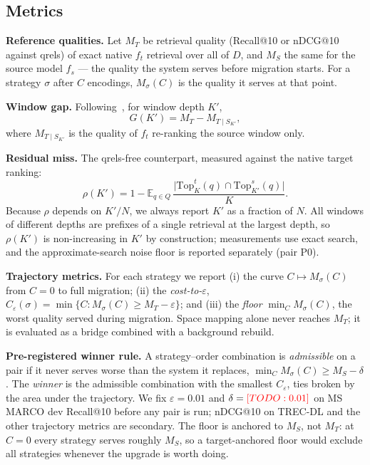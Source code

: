 \documentclass[conference]{IEEEtran}
\newcommand{\todo}[1]{\textcolor{red}{[TODO: #1]}}
\newcommand{\topk}{\mathrm{Top}}
\begin{document}
\subsection{Metrics}

\textbf{Reference qualities.} Let $M_T$ be retrieval quality (Recall@10 or nDCG@10
against qrels) of exact native $f_t$ retrieval over all of $D$, and $M_S$ the same for
the source model $f_s$ --- the quality the system serves before migration starts. For a
strategy $\sigma$ after $C$ encodings, $M_\sigma(C)$ is the quality it serves at that point.

\textbf{Window gap.} Following~\cite{embedflow}, for window depth $K'$,
\[
G(K') = M_T - M_{T\mid S_{K'}},
\]
where $M_{T\mid S_{K'}}$ is the quality of $f_t$ re-ranking the source window only.

\textbf{Residual miss.} The qrels-free counterpart, measured against the native target
ranking:
\[
\rho(K') = 1 - \mathbb{E}_{q\in Q}\,
\frac{\lvert \topk_K^{t}(q) \cap \topk_{K'}^{s}(q)\rvert}{K}.
\]
Because $\rho$ depends on $K'/N$, we always report $K'$ as a fraction of $N$.
All windows of different depths are prefixes of a single retrieval at the largest depth,
so $\rho(K')$ is non-increasing in $K'$ by construction; measurements use exact search,
and the approximate-search noise floor is reported separately (pair P0).

\textbf{Trajectory metrics.} For each strategy we report (i) the curve
$C \mapsto M_\sigma(C)$ from $C{=}0$ to full migration; (ii) the \emph{cost-to-$\varepsilon$},
$C_\varepsilon(\sigma) = \min\{C : M_\sigma(C) \ge M_T - \varepsilon\}$; and (iii) the
\emph{floor} $\min_C M_\sigma(C)$, the worst quality served during migration.
Space mapping alone never reaches $M_T$; it is evaluated as a bridge combined with a
background rebuild.

\textbf{Pre-registered winner rule.} A strategy--order combination is \emph{admissible}
on a pair if it never serves worse than the system it replaces,
$\min_C M_\sigma(C) \ge M_S - \delta$. The \emph{winner} is the admissible combination
with the smallest $C_{\varepsilon}$, ties broken by the area under the trajectory. We fix
$\varepsilon = 0.01$ and $\delta = \todo{0.01}$ on MS MARCO dev Recall@10 before any
pair is run; nDCG@10 on TREC-DL and the other trajectory metrics are secondary. The
floor is anchored to $M_S$, not $M_T$: at $C{=}0$ every strategy serves roughly $M_S$,
so a target-anchored floor would exclude all strategies whenever the upgrade is worth doing.
\end{document}
